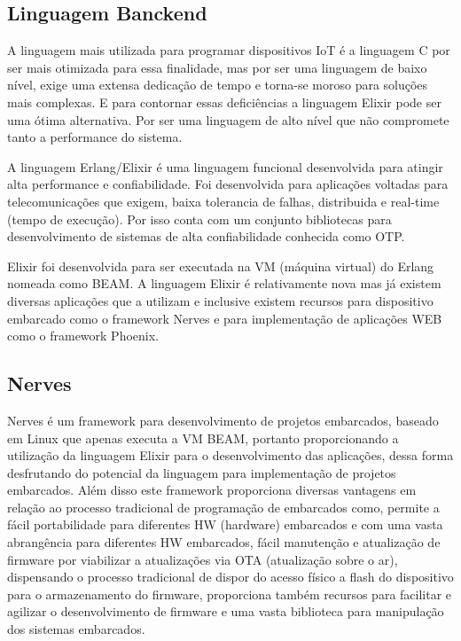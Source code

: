 \documentclass[../../layout.tex]{subfiles}
\begin{document}
\subsection{Linguagem Banckend}
\hspace*{3em}A linguagem mais utilizada para programar dispositivos IoT é a linguagem C por ser mais otimizada para essa finalidade, mas por ser uma linguagem de baixo nível, exige uma extensa dedicação de tempo e torna-se moroso para soluções mais complexas. E para contornar essas deficiências a linguagem Elixir pode ser uma ótima alternativa. Por ser uma linguagem de alto  nível que não compromete tanto a performance do sistema.\par
A linguagem Erlang/Elixir é uma linguagem funcional desenvolvida para atingir alta performance e confiabilidade. Foi desenvolvida para aplicações voltadas para telecomunicações que exigem, baixa tolerancia de falhas, distribuida e real-time (tempo de execução). Por isso conta com um conjunto bibliotecas para desenvolvimento de sistemas de alta confiabilidade conhecida como OTP.\par
Elixir foi desenvolvida para ser executada na VM (máquina virtual) do Erlang nomeada como BEAM. A linguagem Elixir é relativamente nova mas já existem diversas aplicações que a utilizam e inclusive existem recursos para dispositivo embarcado como o framework Nerves \cite{ElixirorIoT} e para implementação de aplicações WEB como o framework Phoenix.

\subsection{Nerves}
\hspace*{3em}Nerves é um framework para desenvolvimento de projetos embarcados, baseado em Linux que apenas executa a VM BEAM, portanto proporcionando a utilização da linguagem Elixir para o desenvolvimento das aplicações, dessa forma desfrutando do potencial da linguagem para implementação de projetos embarcados. Além disso este framework proporciona diversas vantagens  em relação ao processo tradicional de programação de embarcados como, permite a fácil portabilidade para diferentes HW (hardware) embarcados e com uma vasta abrangência para diferentes HW embarcados, fácil manutenção e atualização de firmware por viabilizar a atualizações via OTA (atualização sobre o ar), dispensando o processo tradicional de dispor do acesso físico a flash do dispositivo para o armazenamento do firmware, proporciona também recursos para facilitar e agilizar o desenvolvimento de firmware e uma vasta biblioteca para manipulação dos sistemas embarcados\cite{nerves}.
\end{document}
